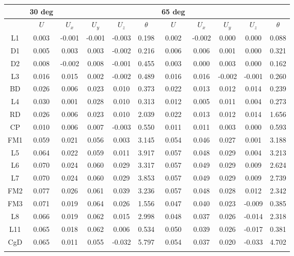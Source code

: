 \documentclass{report}
\begin{document}
\begin{table}
\begin{center}
\small
\begin{tabular}{c|ccccc|ccccc}
& {\bf 30 deg} & & & & & {\bf 65 deg} & & & \\
\hline
\hline
& $U$ & $U_x$ & $U_y$ & $U_z$ & $\theta$ & $U$ & $U_x$ & $U_y$ & $U_z$ & $\theta$ \\
\hline
L1	&	0.003	&	-0.001	&	-0.001	&	-0.003	&	0.198	&	0.002	&	-0.002	&	0.000	&	0.000	&	0.088	\\
D1	&	0.005	&	0.003	&	0.003	&	-0.002	&	0.216	&	0.006	&	0.006	&	0.001	&	0.000	&	0.321	\\
D2	&	0.008	&	-0.002	&	0.008	&	-0.001	&	0.455	&	0.003	&	0.000	&	0.003	&	0.000	&	0.162	\\
L3	&	0.016	&	0.015	&	0.002	&	-0.002	&	0.489	&	0.016	&	0.016	&	-0.002	&	-0.001	&	0.260	\\
BD	&	0.026	&	0.006	&	0.023	&	0.010	&	0.373	&	0.022	&	0.013	&	0.012	&	0.014	&	0.239	\\
L4	&	0.030	&	0.001	&	0.028	&	0.010	&	0.313	&	0.012	&	0.005	&	0.011	&	0.004	&	0.273	\\
RD	&	0.026	&	0.006	&	0.023	&	0.010	&	2.039	&	0.022	&	0.013	&	0.012	&	0.014	&	1.656	\\
CP	&	0.010	&	0.006	&	0.007	&	-0.003	&	0.550	&	0.011	&	0.011	&	0.003	&	0.000	&	0.593	\\
FM1	&	0.059	&	0.021	&	0.056	&	0.003	&	3.145	&	0.054	&	0.046	&	0.027	&	0.001	&	3.188	\\
L5	&	0.064	&	0.022	&	0.059	&	0.011	&	3.917	&	0.057	&	0.048	&	0.029	&	0.004	&	3.213	\\
L6	&	0.070	&	0.024	&	0.060	&	0.029	&	3.317	&	0.057	&	0.049	&	0.029	&	0.009	&	2.624	\\
L7	&	0.070	&	0.024	&	0.060	&	0.029	&	3.853	&	0.057	&	0.049	&	0.029	&	0.009	&	2.739	\\
FM2	&	0.077	&	0.026	&	0.061	&	0.039	&	3.236	&	0.057	&	0.048	&	0.028	&	0.012	&	2.342	\\
FM3	&	0.071	&	0.019	&	0.064	&	0.026	&	1.556	&	0.047	&	0.040	&	0.023	&	-0.009	&	0.385	\\
L8	&	0.066	&	0.019	&	0.062	&	0.015	&	2.998	&	0.048	&	0.037	&	0.026	&	-0.014	&	2.318	\\
L11	&	0.065	&	0.018	&	0.062	&	0.006	&	0.534	&	0.050	&	0.039	&	0.026	&	-0.017	&	0.381	\\
CgD	&	0.065	&	0.011	&	0.055	&	-0.032	&	5.797	&	0.054	&	0.037	&	0.020	&	-0.033	&	4.702	\\
\hline \\
\end{tabular}


\end{center}
\end{table}
\end{document}
